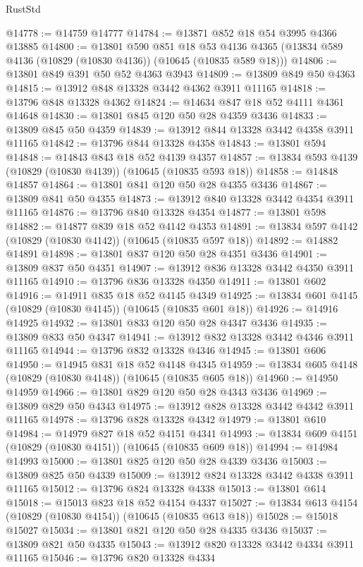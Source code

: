 \begin{lexlean}{RustStd}
\begin{coremodule}
@14778 := @14759 @14777
@14784 := @13871 @852 @18 @54 @3995 @4366 @13885
@14800 := @13801
    @590
    @851
    @18
    @53
    @4136
    @4365
    (@13834 @589 @4136 (@10829 (@10830 @4136)) (@10645 (@10835 @589 @18)))
@14806 := @13801 @849 @391 @50 @52 @4363 @3943
@14809 := @13809 @849 @50 @4363
@14815 := @13912 @848 @13328 @3442 @4362 @3911 @11165
@14818 := @13796 @848 @13328 @4362
@14824 := @14634 @847 @18 @52 @4111 @4361 @14648
@14830 := @13801 @845 @120 @50 @28 @4359 @3436
@14833 := @13809 @845 @50 @4359
@14839 := @13912 @844 @13328 @3442 @4358 @3911 @11165
@14842 := @13796 @844 @13328 @4358
@14843 := @13801 @594
@14848 := @14843 @843 @18 @52 @4139 @4357
@14857 := @13834 @593 @4139 (@10829 (@10830 @4139)) (@10645 (@10835 @593 @18))
@14858 := @14848 @14857
@14864 := @13801 @841 @120 @50 @28 @4355 @3436
@14867 := @13809 @841 @50 @4355
@14873 := @13912 @840 @13328 @3442 @4354 @3911 @11165
@14876 := @13796 @840 @13328 @4354
@14877 := @13801 @598
@14882 := @14877 @839 @18 @52 @4142 @4353
@14891 := @13834 @597 @4142 (@10829 (@10830 @4142)) (@10645 (@10835 @597 @18))
@14892 := @14882 @14891
@14898 := @13801 @837 @120 @50 @28 @4351 @3436
@14901 := @13809 @837 @50 @4351
@14907 := @13912 @836 @13328 @3442 @4350 @3911 @11165
@14910 := @13796 @836 @13328 @4350
@14911 := @13801 @602
@14916 := @14911 @835 @18 @52 @4145 @4349
@14925 := @13834 @601 @4145 (@10829 (@10830 @4145)) (@10645 (@10835 @601 @18))
@14926 := @14916 @14925
@14932 := @13801 @833 @120 @50 @28 @4347 @3436
@14935 := @13809 @833 @50 @4347
@14941 := @13912 @832 @13328 @3442 @4346 @3911 @11165
@14944 := @13796 @832 @13328 @4346
@14945 := @13801 @606
@14950 := @14945 @831 @18 @52 @4148 @4345
@14959 := @13834 @605 @4148 (@10829 (@10830 @4148)) (@10645 (@10835 @605 @18))
@14960 := @14950 @14959
@14966 := @13801 @829 @120 @50 @28 @4343 @3436
@14969 := @13809 @829 @50 @4343
@14975 := @13912 @828 @13328 @3442 @4342 @3911 @11165
@14978 := @13796 @828 @13328 @4342
@14979 := @13801 @610
@14984 := @14979 @827 @18 @52 @4151 @4341
@14993 := @13834 @609 @4151 (@10829 (@10830 @4151)) (@10645 (@10835 @609 @18))
@14994 := @14984 @14993
@15000 := @13801 @825 @120 @50 @28 @4339 @3436
@15003 := @13809 @825 @50 @4339
@15009 := @13912 @824 @13328 @3442 @4338 @3911 @11165
@15012 := @13796 @824 @13328 @4338
@15013 := @13801 @614
@15018 := @15013 @823 @18 @52 @4154 @4337
@15027 := @13834 @613 @4154 (@10829 (@10830 @4154)) (@10645 (@10835 @613 @18))
@15028 := @15018 @15027
@15034 := @13801 @821 @120 @50 @28 @4335 @3436
@15037 := @13809 @821 @50 @4335
@15043 := @13912 @820 @13328 @3442 @4334 @3911 @11165
@15046 := @13796 @820 @13328 @4334

\end{coremodule}
\end{lexlean}
